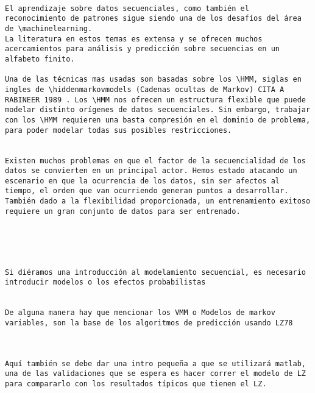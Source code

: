 \begin{lstlisting}

El aprendizaje sobre datos secuenciales, como también el reconocimiento de patrones sigue siendo una de los desafíos del área de \machinelearning.
La literatura en estos temas es extensa y se ofrecen muchos acercamientos para análisis y predicción sobre secuencias en un alfabeto finito.

Una de las técnicas mas usadas son basadas sobre los \HMM, siglas en ingles de \hiddenmarkovmodels (Cadenas ocultas de Markov) CITA A RABINEER 1989 . Los \HMM nos ofrecen un estructura flexible que puede modelar distinto orígenes de datos secuenciales. Sin embargo, trabajar con los \HMM requieren una basta compresión en el dominio de problema, para poder modelar todas sus posibles restricciones.


Existen muchos problemas en que el factor de la secuencialidad de los datos se convierten en un principal actor. Hemos estado atacando un escenario en que la ocurrencia de los datos, sin ser afectos al tiempo, el orden que van ocurriendo generan puntos a desarrollar. También dado a la flexibilidad proporcionada, un entrenamiento exitoso requiere un gran conjunto de datos para ser entrenado.

 



Si diéramos una introducción al modelamiento secuencial, es necesario introducir modelos o los efectos probabilistas


De alguna manera hay que mencionar los VMM o Modelos de markov variables, son la base de los algoritmos de predicción usando LZ78



Aquí también se debe dar una intro pequeña a que se utilizará matlab, una de las validaciones que se espera es hacer correr el modelo de LZ para compararlo con los resultados típicos que tienen el LZ.

\end{lstlisting}